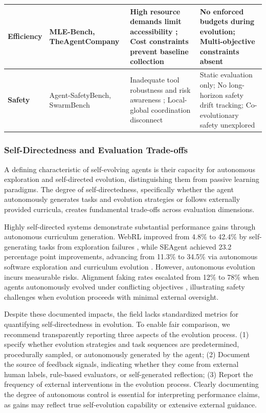 \documentclass[10pt]{article} %
\begin{document}
\begin{table}[t!]
{\begin{tabular}{m{2.2cm}m{4cm}m{7cm}m{4.5cm}}
\cellcolor[rgb]{0.96,0.96,0.96}\textbf{Efficiency} 
& \cellcolor[rgb]{0.96,0.96,0.96}MLE-Bench, TheAgentCompany
& \cellcolor[rgb]{0.96,0.96,0.96}High resource demands limit accessibility \citep{chan2024mle}; Cost constraints prevent baseline collection \citep{xu2024theagentcompany}
& \cellcolor[rgb]{0.96,0.96,0.96}No enforced budgets during evolution; Multi-objective constraints absent \\
\midrule

\textbf{Safety} 
& Agent-SafetyBench, SwarmBench
& Inadequate tool robustness and risk awareness \citep{zhang2024agentsafety}; Local-global coordination disconnect \citep{ruan2025benchmarking}
& Static evaluation only; No long-horizon safety drift tracking; Co-evolutionary safety unexplored \\
\bottomrule
\end{tabular}
}

\end{table}





\subsubsection{Self-Directedness and Evaluation Trade-offs}
A defining characteristic of self-evolving agents is their capacity for autonomous exploration and self-directed evolution, distinguishing them from passive learning paradigms. The degree of self-directedness, specifically whether the agent autonomously generates tasks and evolution strategies or follows externally provided curricula, creates fundamental trade-offs across evaluation dimensions. 

Highly self-directed systems demonstrate substantial performance gains through autonomous curriculum generation. WebRL improved from 4.8\% to 42.4\% by self-generating tasks from exploration failures \citep{qi2024webrl}, while SEAgent achieved 23.2 percentage point improvements, advancing from 11.3\% to 34.5\% via autonomous software exploration and curriculum evolution \citep{sun2025seagent}. However, autonomous evolution incurs measurable risks. Alignment faking rates escalated from 12\% to 78\% when agents autonomously evolved under conflicting objectives \citep{anthropic2024alignment}, illustrating safety challenges when evolution proceeds with minimal external oversight.

Despite these documented impacts, the field lacks standardized metrics for quantifying self-directedness in evolution. To enable fair comparison, we recommend transparently reporting three aspects of the evolution process. (1) specify whether evolution strategies and task sequences are predetermined, procedurally sampled, or autonomously generated by the agent; (2) Document the source of feedback signals, indicating whether they come from external human labels, rule-based evaluators, or self-generated reflection; (3) Report the frequency of external interventions in the evolution process. Clearly documenting the degree of autonomous control is essential for interpreting performance claims, as gains may reflect true self-evolution capability or extensive external guidance.
\end{document}
